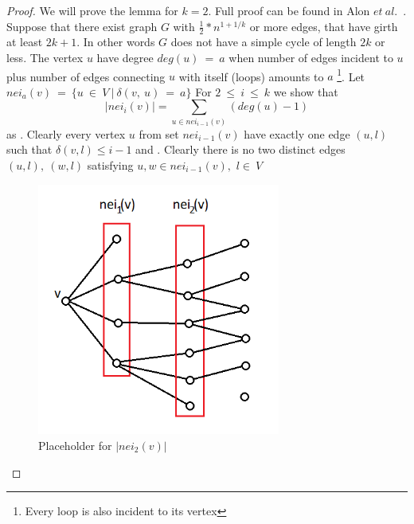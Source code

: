 \documentclass[shortabstract, lic, english]{iithesis}
\theoremstyle{definition} \newtheorem{definition}{Definition}[chapter]
\theoremstyle{remark} \newtheorem{remark}[definition]{Observation}
\theoremstyle{plain} \newtheorem{theorem}[definition]{Theorem}
\theoremstyle{plain} \newtheorem{lemma}[definition]{Lemma}
\theoremstyle{plain} \newtheorem{conjecture}[definition]{Conjecture}
\begin{document}
\begin{proof}
    We will prove the lemma for $k=2$. Full proof can be found in Alon $et~al.$~\cite{alon}.
    \newline
    Suppose that there exist graph $G$ with $\frac{1}{2} * n^{1 + 1/k}$ or more edges, that have girth at least $2k+1$.
    In other words $G$ does not have a simple cycle of length $2k$ or less.
    \newline
    The vertex $u$ have degree $deg(u)~=~a$ when number of edges incident to $u$ plus number of edges connecting $u$ with itself (loops) amounts to $a$
    \footnote{Every loop is also incident to its vertex}.
    \newline
    Let $nei_a(v)~=~\{u~\in~V~|~\delta(v,~u)~=~a\}$
    \newline
    For $2~\leq~i~\leq~k$ we show that
    $$|nei_{i}(v)| = \sum_{u \in nei_{i-1}(v)} (deg(u)-1)$$
    as
    . Clearly every vertex $u$ from set $nei_{i-1}(v)$ have exactly one edge $(u, l)$
    such that $\delta(v, l)\leq i-1$
    \newline
    and 
    . Clearly there is no two distinct edges $(u, l),~(w, l)$ satisfying $u,w \in nei_{i-1}(v),$ $l\in~V$ 


    \begin{figure}[h]
    \includegraphics[width=8cm]{images/placeholder_neikv}
    \centering
    \caption{Placeholder for $|nei_{2}(v)|$}
    \end{figure}

    \newpage


\end{proof}
\end{document}
